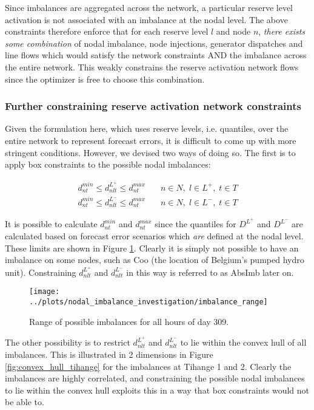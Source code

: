 \documentclass[number,times]{elsarticle}
\begin{document}
Since imbalances are aggregated across the network, a particular reserve level activation is not associated with an imbalance at the nodal level. The above constraints therefore enforce that for each reserve level $l$ and node $n$, \emph{there exists some combination} of nodal imbalance, node injections, generator dispatches and line flows which would satisfy the network constraints AND the imbalance across the entire network. This weakly constrains the reserve activation network flows since the optimizer is free to choose this combination.

\subsubsection{Further constraining reserve activation network constraints} \label{sec:further_constraining_operating_reserve_network_activation_constraints}

Given the formulation here, which uses reserve levels, i.e. quantiles, over the entire network to represent forecast errors, it is difficult to come up with more stringent conditions. However, we devised two ways of doing so. The first is to apply box constraints to the possible nodal imbalances:

\begin{align}
    d_{nt}^{min} \leq d_{nlt}^{L^+} \leq d_{nt}^{max} & \quad n \in N, \; l \in L^+, \; t \in T \\
    d_{nt}^{min} \leq d_{nlt}^{L^-} \leq d_{nt}^{max} & \quad n \in N, \; l \in L^-, \; t \in T
\end{align}

It is possible to calculate $d_{nt}^{min}$ and $d_{nt}^{max}$ since the quantiles for $D^{L^+}$ and $D^{L^-}$ are calculated based on forecast error scenarios which \emph{are} defined at the nodal level. These limits are shown in Figure \ref{fig:imbalance_range}. Clearly it is simply not possible to have an imbalance on some nodes, such as Coo (the location of Belgium's pumped hydro unit). Constraining $d_{nlt}^{L^+}$ and $d_{nlt}^{L^-}$ in this way is referred to as AbsImb later on.

\begin{figure}[ht]
    \centering
    \texttt{[image: ../plots/nodal\_imbalance\_investigation/imbalance\_range]}
    \caption{Range of possible imbalances for all hours of day 309.\label{fig:imbalance_range}}
\end{figure}

The other possibility is to restrict $d_{nlt}^{L^+}$ and $d_{nlt}^{L^-}$ to lie within the convex hull of all imbalances. This is illustrated in 2 dimensions in Figure \ref{fig:convex_hull_tihange} for the imbalances at Tihange 1 and 2. Clearly the imbalances are highly correlated, and constraining the possible nodal imbalances to lie within the convex hull exploits this in a way that box constraints would not be able to.
\end{document}

